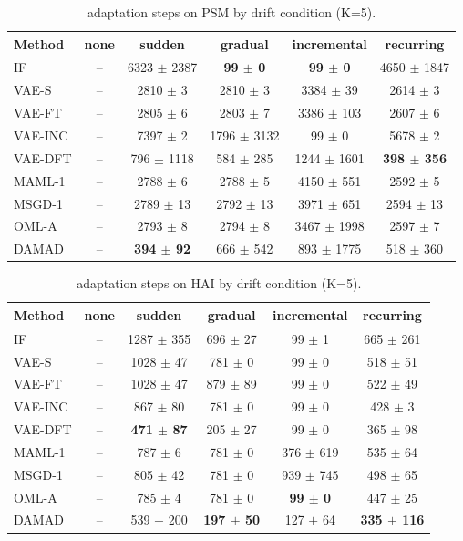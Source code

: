 \begin{table}[t]
\centering
\small
\caption{adaptation steps on PSM by drift condition (K=5).}
\label{tab:drift_adaptation_steps_psm}
\begin{tabular}{lccccc}
\toprule
Method & none & sudden & gradual & incremental & recurring \\
\midrule
IF & – & 6323 $\pm$ 2387 & \textbf{99 $\pm$ 0} & \textbf{99 $\pm$ 0} & 4650 $\pm$ 1847 \\
VAE-S & – & 2810 $\pm$ 3 & 2810 $\pm$ 3 & 3384 $\pm$ 39 & 2614 $\pm$ 3 \\
VAE-FT & – & 2805 $\pm$ 6 & 2803 $\pm$ 7 & 3386 $\pm$ 103 & 2607 $\pm$ 6 \\
VAE-INC & – & 7397 $\pm$ 2 & 1796 $\pm$ 3132 & 99 $\pm$ 0 & 5678 $\pm$ 2 \\
VAE-DFT & – & 796 $\pm$ 1118 & 584 $\pm$ 285 & 1244 $\pm$ 1601 & \textbf{398 $\pm$ 356} \\
MAML-1 & – & 2788 $\pm$ 6 & 2788 $\pm$ 5 & 4150 $\pm$ 551 & 2592 $\pm$ 5 \\
MSGD-1 & – & 2789 $\pm$ 13 & 2792 $\pm$ 13 & 3971 $\pm$ 651 & 2594 $\pm$ 13 \\
OML-A & – & 2793 $\pm$ 8 & 2794 $\pm$ 8 & 3467 $\pm$ 1998 & 2597 $\pm$ 7 \\
DAMAD & – & \textbf{394 $\pm$ 92} & 666 $\pm$ 542 & 893 $\pm$ 1775 & 518 $\pm$ 360 \\
\bottomrule
\end{tabular}
\end{table}

\begin{table}[t]
\centering
\small
\caption{adaptation steps on HAI by drift condition (K=5).}
\label{tab:drift_adaptation_steps_hai}
\begin{tabular}{lccccc}
\toprule
Method & none & sudden & gradual & incremental & recurring \\
\midrule
IF & – & 1287 $\pm$ 355 & 696 $\pm$ 27 & 99 $\pm$ 1 & 665 $\pm$ 261 \\
VAE-S & – & 1028 $\pm$ 47 & 781 $\pm$ 0 & 99 $\pm$ 0 & 518 $\pm$ 51 \\
VAE-FT & – & 1028 $\pm$ 47 & 879 $\pm$ 89 & 99 $\pm$ 0 & 522 $\pm$ 49 \\
VAE-INC & – & 867 $\pm$ 80 & 781 $\pm$ 0 & 99 $\pm$ 0 & 428 $\pm$ 3 \\
VAE-DFT & – & \textbf{471 $\pm$ 87} & 205 $\pm$ 27 & 99 $\pm$ 0 & 365 $\pm$ 98 \\
MAML-1 & – & 787 $\pm$ 6 & 781 $\pm$ 0 & 376 $\pm$ 619 & 535 $\pm$ 64 \\
MSGD-1 & – & 805 $\pm$ 42 & 781 $\pm$ 0 & 939 $\pm$ 745 & 498 $\pm$ 65 \\
OML-A & – & 785 $\pm$ 4 & 781 $\pm$ 0 & \textbf{99 $\pm$ 0} & 447 $\pm$ 25 \\
DAMAD & – & 539 $\pm$ 200 & \textbf{197 $\pm$ 50} & 127 $\pm$ 64 & \textbf{335 $\pm$ 116} \\
\bottomrule
\end{tabular}
\end{table}

